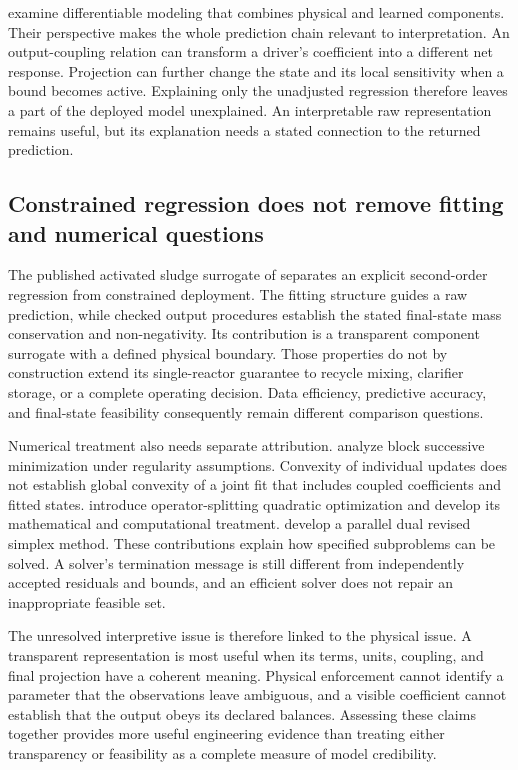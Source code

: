 \citet{Shen2023} examine differentiable modeling that combines physical and learned components. Their perspective makes the whole prediction chain relevant to interpretation. An output-coupling relation can transform a driver's coefficient into a different net response. Projection can further change the state and its local sensitivity when a bound becomes active. Explaining only the unadjusted regression therefore leaves a part of the deployed model unexplained. An interpretable raw representation remains useful, but its explanation needs a stated connection to the returned prediction.

\subsection{Constrained regression does not remove fitting and numerical questions}

The published activated sludge surrogate of \citet{Selerio2026} separates an explicit second-order regression from constrained deployment. The fitting structure guides a raw prediction, while checked output procedures establish the stated final-state mass conservation and non-negativity. Its contribution is a transparent component surrogate with a defined physical boundary. Those properties do not by construction extend its single-reactor guarantee to recycle mixing, clarifier storage, or a complete operating decision. Data efficiency, predictive accuracy, and final-state feasibility consequently remain different comparison questions.

Numerical treatment also needs separate attribution. \citet{Razaviyayn2013} analyze block successive minimization under regularity assumptions. Convexity of individual updates does not establish global convexity of a joint fit that includes coupled coefficients and fitted states. \citet{Stellato2018} introduce operator-splitting quadratic optimization and \citet{Stellato2020} develop its mathematical and computational treatment. \citet{HuangfuHall2018} develop a parallel dual revised simplex method. These contributions explain how specified subproblems can be solved. A solver's termination message is still different from independently accepted residuals and bounds, and an efficient solver does not repair an inappropriate feasible set.

The unresolved interpretive issue is therefore linked to the physical issue. A transparent representation is most useful when its terms, units, coupling, and final projection have a coherent meaning. Physical enforcement cannot identify a parameter that the observations leave ambiguous, and a visible coefficient cannot establish that the output obeys its declared balances. Assessing these claims together provides more useful engineering evidence than treating either transparency or feasibility as a complete measure of model credibility.

